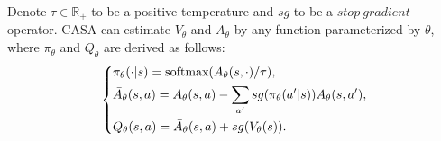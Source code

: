 



Denote $\tau \in \mathbb{R}_+$ to be a positive temperature and $sg$ to be a $stop\ gradient$ operator. 
CASA can estimate $V_\theta$ and $A_\theta$ by any function parameterized by $\theta$, where $\pi_\theta$ and $Q_\theta$ are derived as follows:
\begin{equation}
\label{eq:casa}
\left\{
    \begin{aligned}
        &\pi_\theta(\cdot|s) = \text{softmax}(A_\theta(s, \cdot) /
        \tau), \\
        &\Bar{A}_\theta(s, a) = A_\theta(s, a) - \sum_{a'} sg(\pi_\theta(a'|s)) A_\theta(s, a'), \\
        &Q_\theta(s, a) = \Bar{A}_\theta(s, a) + sg(V_\theta(s)).
    \end{aligned}
\right. 
\end{equation}

